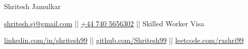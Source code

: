 \documentclass{article}
\begin{document}
\begin{center}

\LARGE Shritesh Jamulkar \\

\vspace{3pt}

\large \textcolor{NavyBlue}{\href{mailto:shritesh.sj@gmail@gmail.com}{shritesh.sj@gmail.com} || \href{tel:+447405656340}{+44 740 5656302} || Skilled Worker Visa} \\

\vspace{3pt}

\normalsize \href{https://linkedin.com/in/shritesh99}{linkedin.com/in/shritesh99} || \href{https://github.com/Shritesh99}{github.com/Shritesh99} || \href{https://leetcode.com/rxshri99}{leetcode.com/rxshri99} \\
\end{center}
\end{document}
